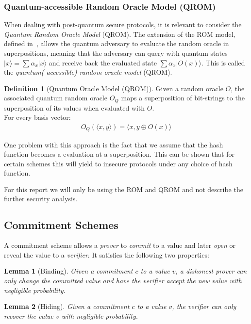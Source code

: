 \documentclass[11pt]{report}
\theoremstyle{definition}
\newtheorem{definition}{Definition}[section]
\theoremstyle{plain}
\newtheorem{lemma}{Lemma}[section]
\begin{document}
\subsubsection{Quantum-accessible Random Oracle Model (QROM)}\label{sub:qrom}
When dealing with post-quantum secure protocols, it is relevant to consider the \textit{Quantum Random Oracle Model} (QROM). The extension of the ROM model, defined in~\cite{boneh2011random}, allows the quantum adversary to evaluate the random oracle in superpositions, meaning that the adversary can query with quantum states $|x \rangle = \sum \alpha_x |x \rangle$ and receive back the evaluated state $\sum\alpha_x |O(x)\rangle$. This is called the \textit{quantum(-accessible) random oracle model} (QROM).

\begin{definition}[Quantum Oracle Model (QROM)]
  Given a random oracle $O$, the associated quantum random oracle $O_Q$ maps a superposition of bit-strings to the superposition of its values when evaluated with $O$.\\
  For every basis vector:
  \begin{align}
    O_Q(\langle x,y \rangle) = \langle x,y \oplus O(x) \rangle
  \end{align}
\end{definition}

One problem with this approach is the fact that we assume that the hash function becomes a evaluation at a superposition. This can be shown that for certain schemes this will yield to insecure protocols under any choice of hash function.

For this report we will only be using the ROM and QROM and not describe the further security analysis.

\subsection{Commitment Schemes}
A commitment scheme allows a \textit{prover} to \textit{commit} to a value and later \textit{open} or reveal the value to a \textit{verifier}. It satisfies the following two properties:

\begin{lemma}[Binding]\label{lem:binding}
  Given a commitment $c$ to a value $v$, a dishonest prover can only change the committed value and have the verifier accept the new value with negligible probability.
\end{lemma}
\begin{lemma}[Hiding]\label{lem:hiding}
  Given a commitment $c$ to a value $v$, the verifier can only recover the value $v$ with negligible probability.
\end{lemma}
\end{document}
